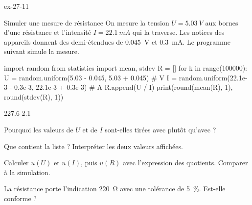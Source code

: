\begin{blocLivre}{ex-27-11}
\begin{exercice}[2]{Simuler une mesure de résistance}
On mesure la tension $U=\qty{5,03}{V}$ aux bornes d'une résistance et l'intensité $I=\qty{22,1}{mA}$ qui la traverse. Les notices
des appareils donnent des demi-étendues de \qty{0,045}{V} et \qty{0,3}{mA}. Le programme suivant simule la mesure.
\begin{python}
import random
from statistics import mean, stdev
R = []
for k in range(100000):
    U = random.uniform(5.03 - 0.045, 5.03 + 0.045)            # V
    I = random.uniform(22.1e-3 - 0.3e-3, 22.1e-3 + 0.3e-3)    # A
    R.append(U / I)
print(round(mean(R), 1), round(stdev(R), 1))
\end{python}
\begin{console}
227.6 2.1
\end{console}
\begin{questions}
\item {}Pourquoi les valeurs de $U$ et de $I$ sont-elles tirées avec  plutôt
qu'avec  ?
\item Que contient la liste  ? Interpréter les deux valeurs affichées.
\item Calculer $u(U)$ et $u(I)$, puis $u(R)$ avec l'expression des quotients. Comparer à la simulation.
\item La résistance porte l'indication \qty{220}{\ohm} avec une tolérance de 5~\%. Est-elle conforme ?
\end{questions}
\end{exercice}
\end{blocLivre}
